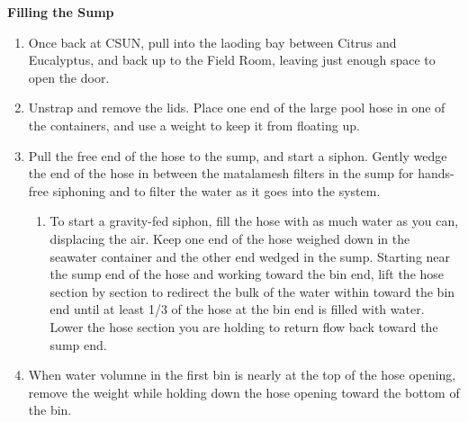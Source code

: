 \documentclass[
]{book}
\providecommand{\tightlist}{%
  \setlength{\itemsep}{0pt}\setlength{\parskip}{0pt}}
\begin{document}
\textbf{Filling the Sump}

\begin{enumerate}
\def\labelenumi{\arabic{enumi}.}
\tightlist
\item
  Once back at CSUN, pull into the laoding bay between Citrus and Eucalyptus, and back up to the Field Room, leaving just enough space to open the door.
\item
  Unstrap and remove the lids. Place one end of the large pool hose in one of the containers, and use a weight to keep it from floating up.
\item
  Pull the free end of the hose to the sump, and start a siphon. Gently wedge the end of the hose in between the matalamesh filters in the sump for hands-free siphoning and to filter the water as it goes into the system.

  \begin{enumerate}
  \def\labelenumii{\arabic{enumii}.}
  \tightlist
  \item
    To start a gravity-fed siphon, fill the hose with as much water as you can, displacing the air. Keep one end of the hose weighed down in the seawater container and the other end wedged in the sump. Starting near the sump end of the hose and working toward the bin end, lift the hose section by section to redirect the bulk of the water within toward the bin end until at least 1/3 of the hose at the bin end is filled with water. Lower the hose section you are holding to return flow back toward the sump end.
  \end{enumerate}
\item
  When water volumne in the first bin is nearly at the top of the hose opening, remove the weight while holding down the hose opening toward the bottom of the bin.


\end{enumerate}
\end{document}

